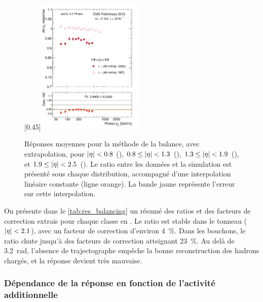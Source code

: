\begin{figure}[p!]
    \subcaptionbox{\label{fig:bal_extrap_eta1925}}[0.45\textwidth]{\includegraphics[width=0.45\textwidth]{chapitre4/figs/resp_balancing_extrap/response_eta1925_balancing_extrap.pdf}}
    \caption{Réponses moyennes pour la méthode de la balance, avec extrapolation, pour $\lvert \eta \rvert < \num{0.8}$ (), $\num{0.8} \leq \lvert \eta \rvert < \num{1.3}$ (), $\num{1.3} \leq \lvert \eta \rvert < \num{1.9}$ (), et $\num{1.9} \leq \lvert \eta \rvert < \num{2.5}$ (). Le ratio entre les données et la simulation est présenté sous chaque distribution, accompagné d'une interpolation linéaire constante (ligne orange). La bande jaune représente l'erreur sur cette interpolation.}
    \label{fig:balancing_extrap_resp}
\end{figure}

\bigskip

On présente dans le \cref{tab:res_balancing} un résumé des ratios et des facteurs de correction extrais pour chaque classe en \aeta. Le ratio est stable dans le tonneau ($\lvert \eta \rvert < \num{2.1}$), avec un facteur de correction d'environ \SI{4}{\%}. Dans les bouchons, le ratio chute jusqu'à des facteurs de correction atteignant \SI{23}{\%}. Au delà de \SI{3.2}{\radian}, l'absence de trajectographe empêche la bonne reconstruction des hadrons chargés, et la réponse devient très mauvaise.

\subsubsection{Dépendance de la réponse en fonction de l'activité additionnelle} \label{sec:res_balancing_extrap}


